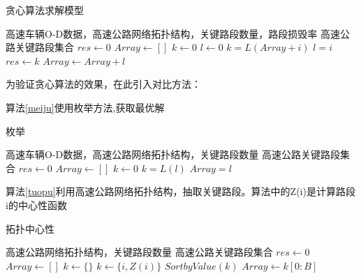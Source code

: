 		\begin{algorithm}  
        \caption{贪心算法求解模型}  
        \label{tanxin}
        \begin{algorithmic}[1] %
            \Require 高速车辆O-D数据，高速公路网络拓扑结构，关键路段数量，路段损毁率
            \Ensure 高速公路关键路段集合
                \State $res\gets 0$  
                \State $Array\gets []$  
                \State $k\gets 0$  
                \State $l\gets 0$  
                        	\State $k=L(Array+i)$  
                        	\State $l=i$  
                    	\EndIf
                	\EndFor    
                    \State $res\gets k$
                    \State $Array\gets Array+l$
                \EndWhile  
                \State {}  
            \EndFunction  
        \end{algorithmic}  
    	\end{algorithm} 

    	为验证贪心算法的效果，在此引入对比方法：

    	算法\ref{meiju}使用枚举方法,获取最优解

    	\begin{algorithm}  
        \caption{枚举} 
        \label{meiju} 
        \begin{algorithmic}[1] %
            \Require 高速车辆O-D数据，高速公路网络拓扑结构，关键路段数量
            \Ensure 高速公路关键路段集合
                \State $res\gets 0$  
                \State $Array\gets []$  
                \State $k\gets 0$ 
                		\If{$L(l)>k$}  
                        	\State $k=L(l)$  
                        	\State $Array=l$  
                    	\EndIf
                	\EndFor  
                \State {}  
            \EndFunction  
        \end{algorithmic}  
    	\end{algorithm} 

    	算法\ref{tuopu}利用高速公路网络拓扑结构，抽取关键路段。算法中的Z(i)是计算路段i的中心性函数

    	\begin{algorithm}  
        \caption{拓扑中心性}  
        \label{tuopu}
        \begin{algorithmic}[1] %
            \Require 高速公路网络拓扑结构，关键路段数量
            \Ensure 高速公路关键路段集合
                \State $res\gets 0$  
                \State $Array\gets []$  
                \State $k\gets \{\}$ 
                		\State $k\gets \{i,Z(i)\}$ 
                	\EndFor  
                \State $SortbyValue(k)$
                \State $Array\gets k[0:B]$
                \State {}  
            \EndFunction  
        \end{algorithmic}  
    	\end{algorithm} 

